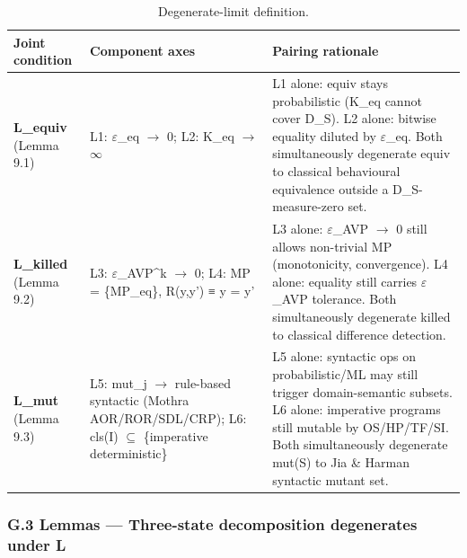 \documentclass[review,12pt,authoryear]{elsarticle}
\begin{document}
{\def\LTcaptype{table} %
\begin{longtable}[]{@{}
  >{\raggedright\arraybackslash}p{}
  >{\raggedright\arraybackslash}p{}
  >{\raggedright\arraybackslash}p{}@{}}
\caption{Degenerate-limit definition.}\label{tab:p2-29}\\
\toprule\noalign{}
\begin{minipage}[b]{\linewidth}\raggedright
Joint condition
\end{minipage} & \begin{minipage}[b]{\linewidth}\raggedright
Component axes
\end{minipage} & \begin{minipage}[b]{\linewidth}\raggedright
Pairing rationale
\end{minipage} \\
\midrule\noalign{}
\endhead
\bottomrule\noalign{}
\endlastfoot
\textbf{L\_equiv} (Lemma 9.1) & L1: $\varepsilon$\_eq $\to$ 0; L2: K\_eq $\to$ $\infty$ & L1 alone:
equiv stays probabilistic (K\_eq cannot cover D\_S). L2 alone: bitwise
equality diluted by $\varepsilon$\_eq. Both simultaneously degenerate equiv to
classical behavioural equivalence outside a D\_S-measure-zero set. \\
\textbf{L\_killed} (Lemma 9.2) & L3: $\varepsilon$\_AVP\^{}k $\to$ 0; L4: MP =
\{MP\_eq\}, R(y,y') ≡ y = y' & L3 alone: $\varepsilon$\_AVP $\to$ 0 still allows
non-trivial MP (monotonicity, convergence). L4 alone: equality still
carries $\varepsilon$\_AVP tolerance. Both simultaneously degenerate killed to
classical difference detection. \\
\textbf{L\_mut} (Lemma 9.3) & L5: mut\_j $\to$ rule-based syntactic (Mothra
AOR/ROR/SDL/CRP); L6: cls(I) $\subseteq$ \{imperative deterministic\} & L5 alone:
syntactic ops on probabilistic/ML may still trigger domain-semantic
subsets. L6 alone: imperative programs still mutable by OS/HP/TF/SI.
Both simultaneously degenerate mut(S) to Jia \& Harman syntactic mutant
set. \\
\end{longtable}
}

\subsubsection{G.3 Lemmas --- Three-state decomposition degenerates under L}\label{g.3-lemmas-three-state-decomposition-degenerates-under-l}
\end{document}
